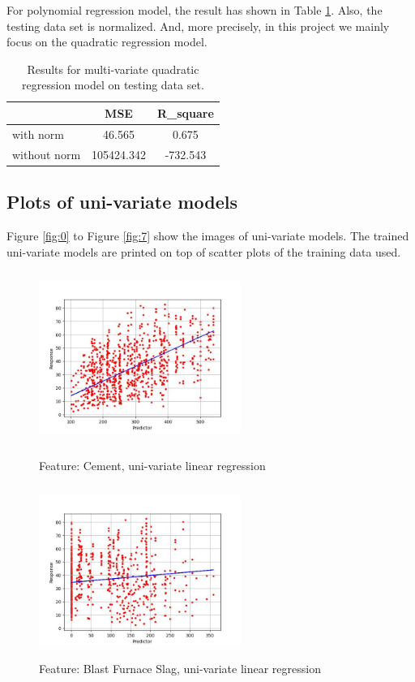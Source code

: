 \documentclass{article}
\begin{document}
For polynomial regression model, the result has shown in Table \ref{tab:test_poly}. Also, the testing data set is normalized. And, more precisely, in this project we mainly focus on the quadratic regression model.

\begin{table}[!ht]
\centering
\begin{tabular}{|l|c|c|}
\hline
         &  MSE & R\_square \\
\hline
with norm &  46.565  & 0.675\\
\hline
without norm & 105424.342 & -732.543 \\
\hline
\end{tabular}
\caption{\label{tab:test_poly}Results for multi-variate quadratic regression model on testing data set.}
\end{table}




\subsection{Plots of uni-variate models }
Figure \ref{fig:0} to Figure \ref{fig:7} show the images of uni-variate models. The trained uni-variate models are printed on top of scatter plots of the training data used.

\begin{figure}[!htbp]
    \centering
    \begin{minipage}[t]{0.49\textwidth}
        \centering
        \includegraphics[height = 5.6cm, width=6.6cm]{images/0.jpg}
        \caption{Feature: Cement, uni-variate linear regression}
        \label{fig:0}
    \end{minipage}
    \begin{minipage}[t]{0.49\textwidth}
        \centering
        \includegraphics[height = 5.6cm, width=6.6cm]{images/1.jpg}
        \caption{Feature: Blast Furnace Slag, uni-variate linear regression}
        \label{fig:1}
    \end{minipage}
\end{figure}
\end{document}
